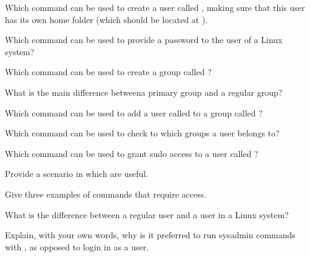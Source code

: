 \begin{exercises}
  \item Which command can be used to create a user called , making sure that this user has its own home folder (which should be located at ).
  \item Which command can be used to provide a password to the  user of a Linux system?
  \item Which command can be used to create a group called ?
  \item What is the main difference betweena  primary group and a regular group?
  \item Which command can be used to add a user called  to a group called ?
  \item Which command can be used to check to which groups a user belongs to?
  \item Which command can be used to grant sudo access to a user called ?
  \item Provide a scenario in which  are useful.
  \item Give three examples of commands that require  access.
  \item What is the difference between a regular user and a  user in a Linux system?
  \item Explain, with your own words, why is it preferred to run sysadmin commands with , as opposed to login in as a  user.
\end{exercises}